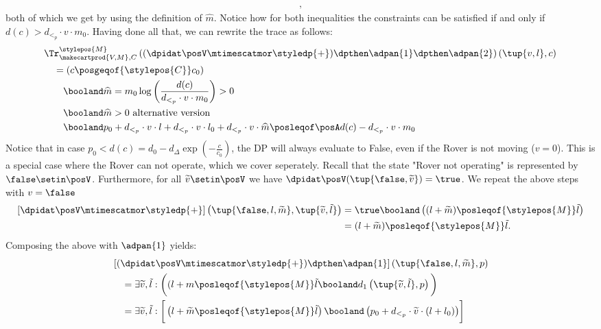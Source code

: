 {\begin{example}
\begin{align}
    ,\end{align}
    both of which we get by using the definition of $\widehat{m}$. Notice how for both inequalities the constraints can be satisfied if and only if $d(c) > d_{<_p}\cdot v \cdot m_0$. Having done all that, we can rewrite the trace as follows:
    \begin{align*}
        &\Tr_{\makecartprod{V,M}, C}^{\stylepos{M}}\left((\dpidat\posV \mtimescatmor \styledp{+})\dpthen \adpan{1} \dpthen \adpan{2}\right)\left(\tup{v, l}, c\right)  \notag \\
        & \quad = (c \posgeqof{\stylepos{C}} c_0) \notag\\
        & \qquad \booland\widehat{m} = m_0 \log \left(\frac{d(c)}{d_{<_p} \cdot v \cdot m_0}\right) > 0 \notag\\
        & \qquad \booland \widehat{m} > 0 \text{ alternative version} \notag\\
        & \qquad \booland p_0 + d_{<_p} \cdot v \cdot l + d_{<_p} \cdot v \cdot l_0 + d_{<_p} \cdot v \cdot \widehat{m} \posleqof\posA d(c) - d_{<_p} \cdot v \cdot m_0
    \end{align*}
    Notice that in case $p_0 < d(c) = d_0 - d_\Delta \exp\left(-\frac{c}{c_0}\right)$, the DP will always evaluate to False, even if the Rover is not moving ($v=0$). This is a special case where the Rover can not operate, which we cover seperately. Recall that the state "Rover not operating" is represented by $\false \setin \posV$. Furthermore, for all $\widetilde{v} \setin \posV$ we have $\dpidat\posV(\tup{\false, \widetilde{v}}) = \true$. We repeat the above steps with $v =\false$
    \begin{align}
        \left[\dpidat\posV\mtimescatmor \styledp{+}\right]\left(\tup{\false, l, \widetilde{m}},\tup{\widetilde{v},\tilde{l}}\right) &= \true \booland\left((l + \widetilde{m})\posleqof{\stylepos{M}} \tilde{l}\right)\\
        &= (l + \widetilde{m})\posleqof{\stylepos{M}} \tilde{l}
    .\end{align}
    Composing the above with $\adpan{1}$ yields:  
    \begin{align}
        &\left[(\dpidat\posV \mtimescatmor \styledp{+})\dpthen \adpan{1}\right]\left(\tup{\false, l , \widetilde{m}}, p\right) \notag\\
        & \quad = \exists \widetilde{v}, \tilde{l} : \bigg((l+m \posleqof{\stylepos{M}} \tilde{l} \booland d_1\left(\tup{\widetilde{v},\tilde{l}},p\right) \bigg)\\
        & \quad = \exists \widetilde{v}, \tilde{l}:\bigg[\left(l + \widetilde{m} \posleqof{\stylepos{M}} \tilde{l} \right) \booland\left(p_0 + d_{<_p} \cdot \widetilde{v} \cdot (l + l_0) \right)\biggr] \notag\\

\end{align}
\end{example}}
